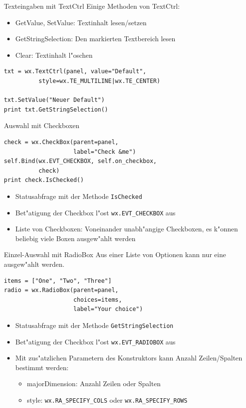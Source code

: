 \begin{frame}[fragile]{Texteingaben mit TextCtrl}
Einige Methoden von TextCtrl:
\begin{itemize}
\item \alert{GetValue}, \alert{SetValue}: Textinhalt lesen/setzen
\item \alert{GetStringSelection}: Den markierten Textbereich lesen
\item \alert{Clear}: Textinhalt l"oschen
\end{itemize}
\begin{lstlisting}[style=Python]
txt = wx.TextCtrl(panel, value="Default",
          style=wx.TE_MULTILINE|wx.TE_CENTER)

txt.SetValue("Neuer Default")
print txt.GetStringSelection()
\end{lstlisting}
\end{frame}

\begin{frame}[fragile]{Auswahl mit Checkboxen}
\begin{lstlisting}[style=Python]
check = wx.CheckBox(parent=panel, 
                    label="Check &me")
self.Bind(wx.EVT_CHECKBOX, self.on_checkbox,
          check)
print check.IsChecked()
\end{lstlisting}
\begin{itemize}
\item Statusabfrage mit der Methode \lstinline{IsChecked}
\item Bet"atigung der Checkbox l"ost \lstinline{wx.EVT_CHECKBOX} aus
\item Liste von Checkboxen: Voneinander unabh"angige Checkboxen, es k"onnen beliebig viele Boxen ausgew"ahlt werden
\end{itemize}
\end{frame}


\begin{frame}[fragile]{Einzel-Auswahl mit RadioBox}
Aus einer Liste von Optionen kann nur eine ausgew"ahlt werden.
\begin{lstlisting}[style=Python]
items = ["One", "Two", "Three"]
radio = wx.RadioBox(parent=panel,
                    choices=items,
                    label="Your choice")
\end{lstlisting}
\begin{itemize}
\item Statusabfrage mit der Methode \lstinline{GetStringSelection}
\item Bet"atigung der Checkbox l"ost \lstinline{wx.EVT_RADIOBOX} aus
\item Mit zus"atzlichen Parametern des Konstruktors kann Anzahl Zeilen/Spalten bestimmt werden:
\begin{itemize}
\item \alert{majorDimension}: Anzahl Zeilen oder Spalten
\item \alert{style}: \lstinline{wx.RA_SPECIFY_COLS} oder \lstinline{wx.RA_SPECIFY_ROWS}
\end{itemize}
\end{itemize}
\end{frame}

